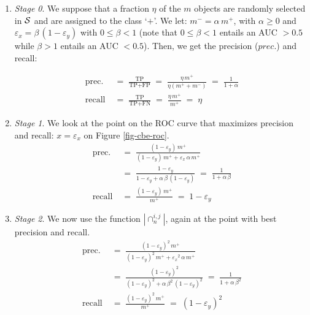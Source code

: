\documentclass[twocolumn,english]{article}
\begin{document}
\begin{enumerate}
   \item \textit{Stage 0}. We suppose that a fraction $\eta$ of the $m$ objects are randomly selected in $\cal S$ and are assigned to the class `$+$'.    We let: $m^- = \alpha \, m^+$, with $\alpha \geq 0$ and $\varepsilon_x = \beta \, (1-\varepsilon_y)$ with $0 \leq \beta < 1$ (note that $0 \leq \beta < 1$ entails an AUC $> 0.5$ while $\beta > 1$ entails an AUC $< 0.5$). Then, we get the precision ($prec.$) and recall:

   \begin{align*}
   \text{prec.} \; &= \; \frac{\text{TP}}{\text{TP} + \text{FP}} \; = \; \frac{\eta \, m^+}{\eta (m^+ + m^-)} \; 
   = \; \frac{1}{1 + \alpha} \\
   \text{recall} \; &= \; \frac{\text{TP}}{\text{TP} + \text{FN}} \; = \; \frac{\eta \, m^+}{m^+} \; = \; \eta
   \end{align*}
   
   
\vspace{0.3cm}   
   \item \textit{Stage 1}. We look at the point on the ROC curve that maximizes precision and recall: $x = \varepsilon_x$ on Figure \ref{fig-cbe-roc}.
      \begin{align*}
   \text{prec.} \; &= \; \frac{(1 - \varepsilon_y) \, m^+}{(1 - \varepsilon_y) \, m^+ + \varepsilon_x \, \alpha \, m^+}
   \\
   &= \;  \frac{1 - \varepsilon_y}{1 - \varepsilon_y + \alpha \, \beta \, (1 - \varepsilon_y)} 
   \; = \; \frac{1}{1 + \alpha \, \beta}\\
   \text{recall} \; &= \;  \frac{(1-\varepsilon_y) \, m^+}{m^+} \; = \; 1 - \varepsilon_y
   \end{align*}

\vspace{0.3cm}   
   \item \textit{Stage 2}. We now use the function  $|\cap_n^{i,j}|$, again at the point with best precision and recall.
         \begin{align*}
   \text{prec.} \; &= \; \frac{(1 - \varepsilon_y)^2 \, m^+}{(1 - \varepsilon_y)^2 \, m^+ + {\varepsilon_x}^2 \, \alpha \, m^+}
   \\
   &= \;  \frac{(1 - \varepsilon_y)^2}{(1 - \varepsilon_y)^2 + \alpha \, \beta^2 \, (1 - \varepsilon_y)^2} 
   \; = \;  \frac{1}{1 + \alpha \, \beta^2 } \\
   \text{recall} \; &= \;  \frac{(1-\varepsilon_y)^2 \, m^+}{m^+} \; = \; (1 - \varepsilon_y)^2
   \end{align*}
   
\end{enumerate}
\end{document}
